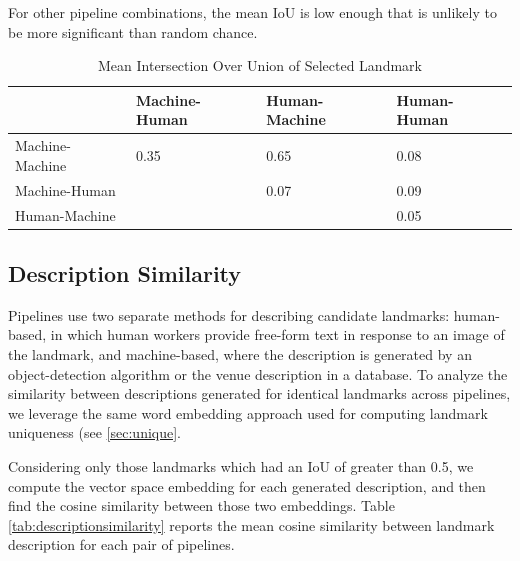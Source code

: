 For other pipeline combinations, the mean IoU is low enough that is unlikely to be more significant than random chance. 

\begin{table}[htbp]
  \centering
  \caption{Mean Intersection Over Union of Selected Landmark}
  \label{tab:iou}
  {\tabulinesep=2mm
    \begin{singlespace}
    \begin{tabu} to \textwidth{|X[c]||X[c]|X[c]|X[c]|}
    \hline
                & Machine-Human & Human-Machine & Human-Human \\
                \hline\hline
Machine-Machine   & 0.35        & 0.65          & 0.08          \\
\hline
Machine-Human &             & 0.07          & 0.09          \\
\hline
Human-Machine   &             &               & 0.05 
\\
    \hline
    \end{tabu}
    \end{singlespace}
    }
\end{table}


\iffalse
\subsection{Description Similarity}

Pipelines use two separate methods for describing candidate landmarks: human-based, in which human workers provide free-form text in response to an image of the landmark, and machine-based, where the description is generated by an object-detection algorithm or the venue description in a database. To analyze the similarity between descriptions generated for identical landmarks across pipelines, we leverage the same word embedding approach used for computing landmark uniqueness (see \ref{sec:unique}. 

Considering only those landmarks which had an IoU of greater than 0.5, we compute the vector space embedding for each generated description, and then find the cosine similarity between those two embeddings. Table \ref{tab:descriptionsimilarity} reports the mean cosine similarity between landmark description for each pair of pipelines.



